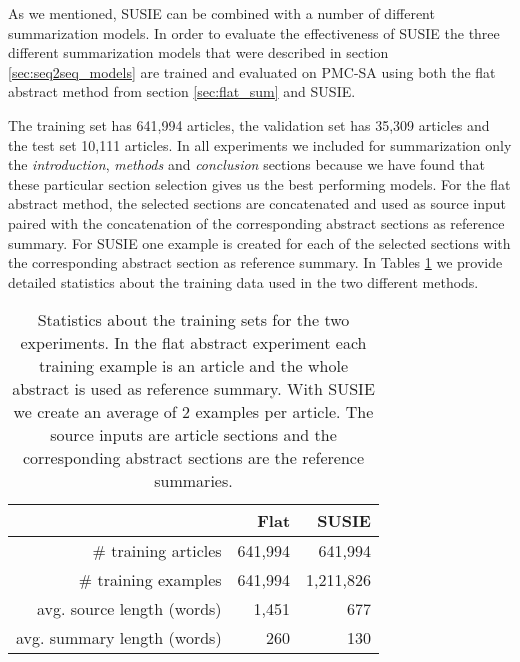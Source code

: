 \documentclass[runningheads]{llncs}
\begin{document}
As we mentioned, SUSIE can be combined with a number of different summarization models. In order to evaluate the effectiveness of SUSIE the three different summarization models that were described in section \ref{sec:seq2seq_models} are trained and evaluated on PMC-SA using both the flat abstract method from section \ref{sec:flat_sum} and SUSIE.


The training set has 641,994 articles, the validation set has 35,309 articles and the test set 10,111 articles. In all experiments we included for summarization only the {\em introduction}, {\em methods} and {\em conclusion} sections because we have found that these particular section selection gives us the best performing models. For the flat abstract method, the selected sections are concatenated and used as source input paired with the concatenation of the corresponding abstract sections as reference summary. For SUSIE one example is created for each of the selected sections with the corresponding abstract section as reference summary. In Tables \ref{exp_stats} we provide detailed statistics about the training data used in the two different methods.

\begin{table}[t!]
\begin{center}
\setlength\tabcolsep{0.2cm}
\begin{tabular}{|r|rr|}
\hline & \textbf{Flat} & \textbf{SUSIE}\\\hline
\# training articles & 641,994 & 641,994\\
\# training examples & 641,994 & 1,211,826\\
avg. source length (words)& 1,451 & 677\\
avg. summary length (words)& 260 & 130\\
\hline
\end{tabular}
\end{center}
\caption{\label{exp_stats} Statistics about the training sets for the two experiments. In the flat abstract experiment each training example is an article and the whole abstract is used as reference summary. With SUSIE we create an average of 2 examples per article. The source inputs are article sections and the corresponding abstract sections are the reference summaries.}
\end{table}
\end{document}

